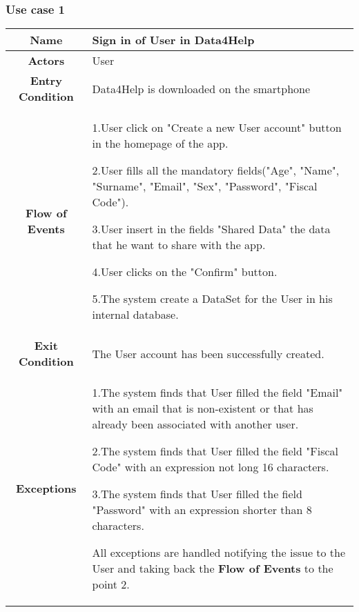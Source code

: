     \subsubsection{Use case 1} %
      \begin{table}[h!]
        \centering
        \begin{tabularx}{\linewidth}{|c|X|}
          \hline
          \textbf{Name} & Sign in of User in Data4Help\\
        	\hline
        	\textbf{Actors} & User \\
        	\hline
        	\textbf{Entry Condition} & Data4Help is downloaded on the smartphone \\
        	\hline
        	\textbf{Flow of Events} & 1.User click on "Create a new User account" button in the homepage of the app.

        					2.User fills all the mandatory fields("Age", "Name", "Surname", "Email", "Sex", "Password", "Fiscal 							Code").

        					3.User insert in the fields "Shared Data" the data that he want to share with the app.

        					4.User clicks on the "Confirm" button.

        					5.The system create a DataSet for the User in his internal database.\\
        	\hline
        	\textbf{Exit Condition} & The User account has been successfully created. \\
        	\hline
        	\textbf{Exceptions} &
        					1.The system finds that User filled the field "Email"  with an email that is non-existent or that has 							already been associated with another user.

        					2.The system finds that User filled the field "Fiscal Code" with an expression not long 16 								characters.

        					3.The system finds that User filled the field "Password" with an expression shorter than 8 								characters.

        					All exceptions are handled notifying the issue to the User and taking back the \textbf{Flow of 							Events} to the point 2.\\
          \hline
        \end{tabularx}
      \end{table}

